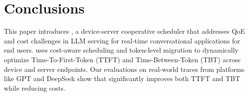 \section{Conclusions}

This paper introduces \disco{}, a device-server cooperative scheduler that addresses QoE and cost challenges in LLM serving for real-time conversational applications for end users. \disco{} uses cost-aware scheduling and token-level migration to dynamically optimize Time-To-First-Token (TTFT) and Time-Between-Token (TBT) across device and server endpoints. Our evaluations on real-world traces from platforms like GPT and DeepSeek show that \disco{} significantly improves both TTFT and TBT while reducing costs.
